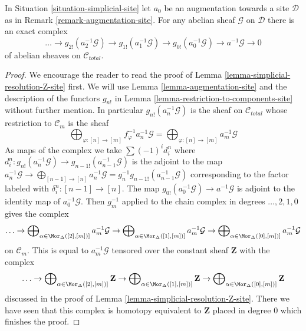\begin{lemma}
\label{lemma-simplicial-resolution-augmentation}
In Situation \ref{situation-simplicial-site} let
$a_0$ be an augmentation towards a site $\mathcal{D}$
as in Remark \ref{remark-augmentation-site}.
For any abelian sheaf $\mathcal{G}$ on $\mathcal{D}$ 
there is an exact complex
$$
\ldots \to
g_{2!}(a_2^{-1}\mathcal{G}) \to
g_{1!}(a_1^{-1}\mathcal{G}) \to
g_{0!}(a_0^{-1}\mathcal{G}) \to
a^{-1}\mathcal{G} \to 0
$$
of abelian sheaves on $\mathcal{C}_{total}$.
\end{lemma}

\begin{proof}
We encourage the reader to read the proof of
Lemma \ref{lemma-simplicial-resolution-Z-site} first.
We will use Lemma \ref{lemma-augmentation-site} and
the description of the functors $g_{n!}$ in
Lemma \ref{lemma-restriction-to-components-site} without further mention.
In particular $g_{n!}(a_n^{-1}\mathcal{G})$ is the
sheaf on $\mathcal{C}_{total}$ whose restriction to $\mathcal{C}_m$
is the sheaf
$$
\bigoplus\nolimits_{\varphi : [n] \to [m]} f_\varphi^{-1}a_n^{-1}\mathcal{G} =
\bigoplus\nolimits_{\varphi : [n] \to [m]} a_m^{-1}\mathcal{G}
$$
As maps of the complex we take $\sum (-1)^i d^n_i$ where
$d^n_i : g_{n!}(a_n^{-1}\mathcal{G}) \to g_{n - 1!}(a_{n - 1}^{-1}\mathcal{G})$
is the adjoint to the map
$a_n^{-1}\mathcal{G} \to \bigoplus_{[n - 1] \to [n]} a_n^{-1}\mathcal{G} =
g_n^{-1}g_{n - 1!}(a_{n - 1}^{-1}\mathcal{G})$
corresponding to the factor labeled with $\delta^n_i : [n - 1] \to [n]$.
The map $g_{0!}(a_0^{-1}\mathcal{G}) \to a^{-1}\mathcal{G}$ is adjoint
to the identity map of $a_0^{-1}\mathcal{G}$.
Then $g_m^{-1}$ applied to the chain complex in degrees
$\ldots, 2, 1, 0$ gives the complex
$$
\ldots \to
\bigoplus\nolimits_{\alpha \in \Mor_\Delta([2], [m])]} a_m^{-1}\mathcal{G} \to
\bigoplus\nolimits_{\alpha \in \Mor_\Delta([1], [m])]} a_m^{-1}\mathcal{G} \to
\bigoplus\nolimits_{\alpha \in \Mor_\Delta([0], [m])]} a_m^{-1}\mathcal{G}
$$
on $\mathcal{C}_m$. This is equal to $a_m^{-1}\mathcal{G}$
tensored over the constant sheaf $\mathbf{Z}$ with the complex
$$
\ldots \to
\bigoplus\nolimits_{\alpha \in \Mor_\Delta([2], [m])]} \mathbf{Z} \to
\bigoplus\nolimits_{\alpha \in \Mor_\Delta([1], [m])]} \mathbf{Z} \to
\bigoplus\nolimits_{\alpha \in \Mor_\Delta([0], [m])]} \mathbf{Z}
$$
discussed in the proof of Lemma \ref{lemma-simplicial-resolution-Z-site}.
There we have seen that this complex is homotopy equivalent to
$\mathbf{Z}$ placed in degree $0$ which finishes the proof.
\end{proof}

